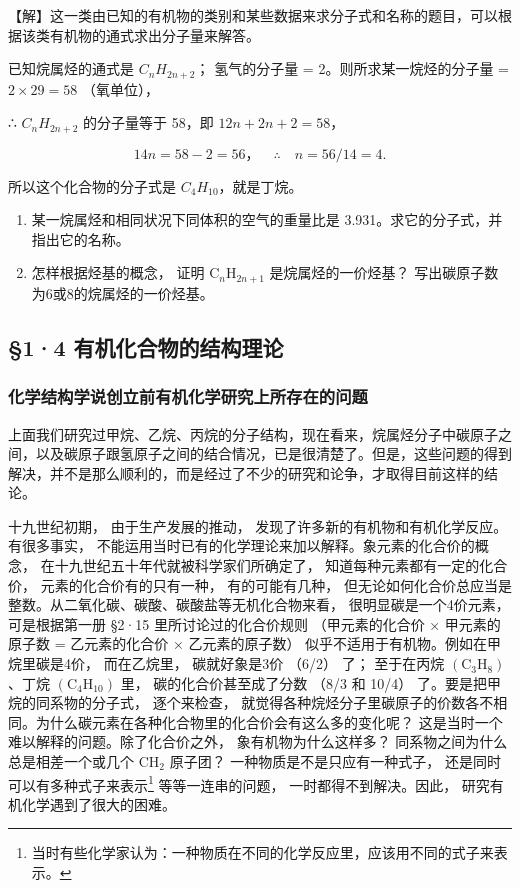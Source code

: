 【解】这一类由已知的有机物的类别和某些数据来求分子式和名称的题目，可以根据该类有机物的通式求出分子量来解答。

已知烷属烃的通式是 \(C_{n}H_{2n+2}\)； 氢气的分子量 =
2。则所求某一烷烃的分子量 = \(2 \times 29 = 58\) （氧单位），

∴ \(C_{n}H_{2n+2}\) 的分子量等于 58，即 \(12n+2n+2=58\)，

\[
14 n = 58 - 2 = 56\text{，} \quad \therefore \quad n = 56 / 14 = 4.
\]

所以这个化合物的分子式是 \(C_{4}H_{10}\)，就是丁烷。

\begin{enumerate}[start=6]
\item
  某一烷属烃和相同状况下同体积的空气的重量比是
  3.931。求它的分子式，并指出它的名称。
\item
  怎样根据烃基的概念， 证明 \(\mathrm{C}_{n} \mathrm{H}_{2 n+1}\)
  是烷属烃的一价烃基？ 写出碳原子数为6或8的烷属烃的一价烃基。
\end{enumerate}

\subsection{§1·4 有机化合物的结构理论}

\subsubsection{化学结构学说创立前有机化学研究上所存在的问题}

上面我们研究过甲烷、乙烷、丙烷的分子结构，现在看来，烷属烃分子中碳原子之间，以及碳原子跟氢原子之间的结合情况，已是很清楚了。但是，这些问题的得到解决，并不是那么顺利的，而是经过了不少的研究和论争，才取得目前这样的结论。

十九世纪初期， 由于生产发展的推动，
发现了许多新的有机物和有机化学反应。有很多事实，
不能运用当时已有的化学理论来加以解释。象元素的化合价的概念，
在十九世纪五十年代就被科学家们所确定了， 知道每种元素都有一定的化合价，
元素的化合价有的只有一种， 有的可能有几种，
但无论如何化合价总应当是整数。从二氧化碳、碳酸、碳酸盐等无机化合物来看，
很明显碳是一个4价元素， 可是根据第一册 §2·15 里所讨论过的化合价规则
（甲元素的化合价 × 甲元素的原子数 = 乙元素的化合价 × 乙元素的原子数）
似乎不适用于有机物。例如在甲烷里碳是4价， 而在乙烷里， 碳就好象是3价
（6/2） 了； 至于在丙烷 \(\left(\mathrm{C}_{3} \mathrm{H}_{8}\right)\)
、丁烷 \(\left(\mathrm{C}_{4} \mathrm{H}_{10}\right)\) 里，
碳的化合价甚至成了分数 （8/3 和 10/4） 了。要是把甲烷的同系物的分子式，
逐个来检查，
就觉得各种烷烃分子里碳原子的价数各不相同。为什么碳元素在各种化合物里的化合价会有这么多的变化呢？
这是当时一个难以解释的问题。除了化合价之外， 象有机物为什么这样多？
同系物之间为什么总是相差一个或几个 \(\mathrm{CH}_{2}\) 原子团？
一种物质是不是只应有一种式子， 还是同时可以有多种式子来表示\footnote{当时有些化学家认为：一种物质在不同的化学反应里，应该用不同的式子来表示。}
等等一连串的问题， 一时都得不到解决。因此，
研究有机化学遇到了很大的困难。

